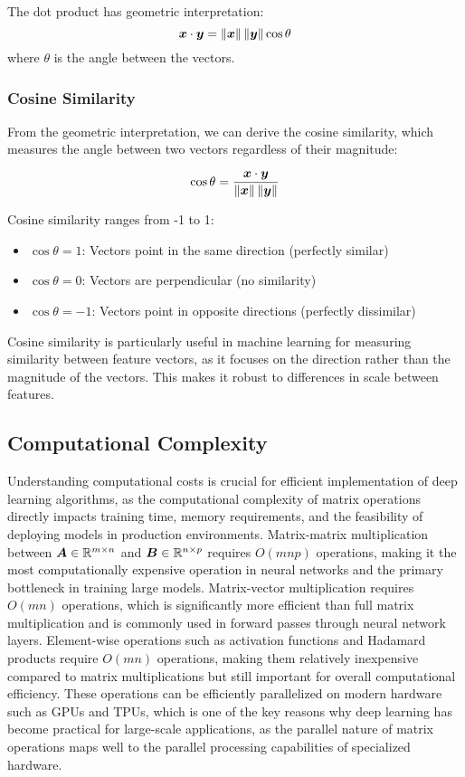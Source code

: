 The dot product has geometric interpretation:
\begin{equation}
    \boldsymbol{x} \cdot \boldsymbol{y} = \left\lVert\boldsymbol{x}\right\rVert \left\lVert\boldsymbol{y}\right\rVert \cos\theta
\end{equation}
where $\theta$ is the angle between the vectors.

\subsubsection{Cosine Similarity}

From the geometric interpretation, we can derive the cosine similarity, which measures the angle between two vectors regardless of their magnitude:

\begin{equation}
    \cos\theta = \frac{\boldsymbol{x} \cdot \boldsymbol{y}}{\left\lVert\boldsymbol{x}\right\rVert \left\lVert\boldsymbol{y}\right\rVert}
\end{equation}

Cosine similarity ranges from -1 to 1:
\begin{itemize}
    \item $\cos\theta = 1$: Vectors point in the same direction (perfectly similar)
    \item $\cos\theta = 0$: Vectors are perpendicular (no similarity)
    \item $\cos\theta = -1$: Vectors point in opposite directions (perfectly dissimilar)
\end{itemize}

Cosine similarity is particularly useful in machine learning for measuring similarity between feature vectors, as it focuses on the direction rather than the magnitude of the vectors. This makes it robust to differences in scale between features.

\subsection{Computational Complexity}

Understanding computational costs is crucial for efficient implementation of deep learning algorithms, as the computational complexity of matrix operations directly impacts training time, memory requirements, and the feasibility of deploying models in production environments. Matrix-matrix multiplication between $\boldsymbol{A} \in \mathbb{R}^{m \times n}$ and $\boldsymbol{B} \in \mathbb{R}^{n \times p}$ requires $O(mnp)$ operations, making it the most computationally expensive operation in neural networks and the primary bottleneck in training large models. Matrix-vector multiplication requires $O(mn)$ operations, which is significantly more efficient than full matrix multiplication and is commonly used in forward passes through neural network layers. Element-wise operations such as activation functions and Hadamard products require $O(mn)$ operations, making them relatively inexpensive compared to matrix multiplications but still important for overall computational efficiency. These operations can be efficiently parallelized on modern hardware such as GPUs and TPUs, which is one of the key reasons why deep learning has become practical for large-scale applications, as the parallel nature of matrix operations maps well to the parallel processing capabilities of specialized hardware.


